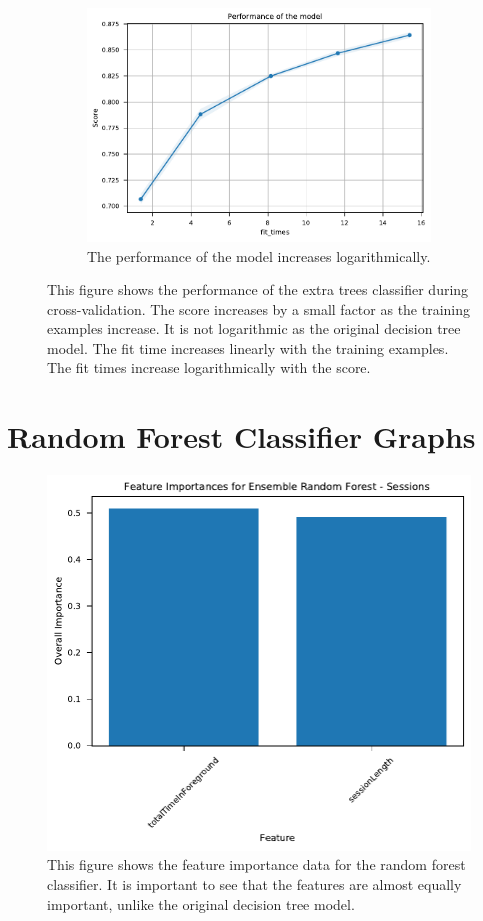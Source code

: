 \documentclass{l4proj}
\begin{document}
\begin{appendices}
\begin{figure}[htbp]
\begin{subfigure}[b]{0.70\textwidth}
        \includegraphics[width=\textwidth]{images/sessions/learning_curve_3_EnsembleExtraTreesSessions.pdf}
        \caption{The performance of the model increases logarithmically.}
        \label{fig:learning_curve_3_EnsembleExtraTreesSessions}
    \end{subfigure}
    \caption{This figure shows the performance of the extra trees classifier during cross-validation. The score increases by a small factor as the training examples increase. It is not logarithmic as the original decision tree model. The fit time increases linearly with the training examples. The fit times increase logarithmically with the score.}
    \label{fig:session_extra_trees_learning_curve}
\end{figure}

\chapter{Random Forest Classifier Graphs}

\begin{figure}[htb]
    \centering
    \includegraphics[width=0.75\linewidth]{images/sessions/feature_importance_EnsembleRandomForestSessions.pdf}
    \caption{This figure shows the feature importance data for the random forest classifier. It is important to see that the features are almost equally important, unlike the original decision tree model.}
    \label{fig:session_random_forest_feature} 
\end{figure}


\end{appendices}
\end{document}
